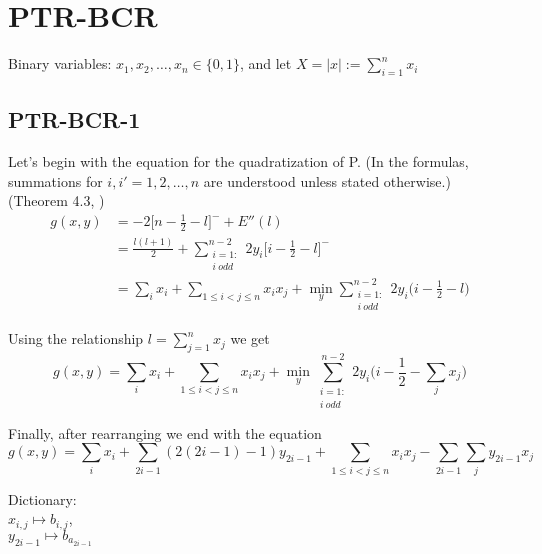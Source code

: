 \documentclass[english,notitlepage,longbibliography,showpacs,preprintnumbers,amsmath,amssymb,aps,prx,nofootinbib,12pt,superscriptaddress]{revtex4-1}
\begin{document}
\section{PTR-BCR}

Binary variables: $x_1,x_2,\dots,x_n\in\{0,1\}$,
and let $X = |x|:=\sum_{i=1}^n x_i$
\subsection{PTR-BCR-1}

Let's begin with the equation for the quadratization of P. (In the formulas, summations for $i,i' = 1,2,\dots,n$ are understood unless stated otherwise.)\\
(Theorem 4.3, \cite{Anthony2014})
\begin{equation}
\begin{split}
  \left.
  g(x,y)
  \right.
  &= -2\Big[n - \frac{1}{2} - l\Big]^{-} + E''(l)\\
  &= \frac{l(l+1)}{2} + \sum_{\substack{i = 1:\\ i\:odd}}^{n-2}2y_i\Big[i-\frac{1}{2}-l\Big]^-\\
  &= \sum_i x_i + \sum_{1\leq i<j\leq n}x_ix_j + \mathop{min}_{y}\sum_{\substack{i = 1:\\ i\:odd}}^{n-2}2y_i\Big(i-\frac{1}{2}-l\Big)
  \end{split}
\end{equation}

\noindent Using the relationship $l = \sum_{j=1}^n x_j$ we get
\begin{equation}
  g(x,y) = \sum_i x_i + \sum_{1\leq i<j\leq n}x_ix_j + \mathop{min}_{y}\sum_{\substack{i = 1:\\ i\:odd}}^{n-2}2y_i\Big(i-\frac{1}{2}-\sum_j x_j\Big)
\end{equation}

\noindent Finally, after rearranging we end with the equation
\begin{equation}
  g(x,y) = \sum_i x_i + \sum_{2i - 1}(2(2i - 1)-1)y_{2i - 1} + \sum_{1\leq i<j\leq n}x_ix_j - \sum_{2i - 1}\sum_jy_{2i - 1} x_j
\end{equation}

\noindent Dictionary:\\
$x_{i,j}\mapsto b_{i,j}$,\\
$y_{2i-1}\mapsto b_{a_{2i-1}}$\\


\end{document}

